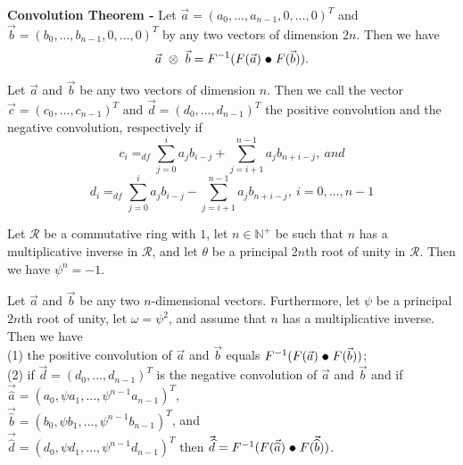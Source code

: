 \documentclass[a4paper]{article}
\begin{document}
\begin{theorem}
\textbf{Convolution Theorem -} Let $\vec{a} = (a_{0}, \ldots, a_{n-1}, 0, \ldots, 0)^{T}$ and $\vec{b} = (b_{0}, \ldots, b_{n-1}, 0, \ldots, 0)^{T}$ by any two vectors of dimension $2n$. Then we have
$$\vec{a}\ \otimes\ \vec{b} = F^{-1}(F(\vec{a})\ \tikz\draw[black,fill=black] (0,0) circle (.5ex);\ F(\vec{b})).$$
\end{theorem}


\begin{definition}
Let $\vec{a}$ and $\vec{b}$ be any two vectors of dimension $n$. Then we call the vector $\vec{c} = (c_{0}, \ldots, c_{n-1})^{T}$ and $\vec{d} = (d_{0}, \ldots, d_{n-1})^{T}$ the positive convolution and the negative convolution, respectively if
$$c_{i} =_{df} \sum_{j=0}^{i}a_{j}b_{i-j} + \sum_{j=i+1}^{n-1}a_{j}b_{n+i-j},\ and$$
$$d_{i} =_{df} \sum_{j=0}^{i}a_{j}b_{i-j} - \sum_{j=i+1}^{n-1}a_{j}b_{n+i-j},\ i=0, \ldots, n - 1$$
\end{definition}


\begin{lemma}
Let $\mathcal{R}$ be a commutative ring with $1$, let $n \in \mathbb{N}^{+}$ be such that $n$ has a multiplicative inverse in $\mathcal{R}$, and let $\theta$ be a principal $2n$th root of unity in $\mathcal{R}$. Then we have $\psi^{n} = -1$.
\end{lemma}


\begin{theorem}
Let $\vec{a}$ and $\vec{b}$ be any two $n$-dimensional vectors. Furthermore, let $\psi$ be a principal $2n$th root of unity, let $\omega = \psi^{2}$, and assume that $n$ has a multiplicative inverse. Then we have \\
(1) the positive convolution of $\vec{a}$ and $\vec{b}$ equals $F^{-1}(F(\vec{a})\ \tikz\draw[black,fill=black] (0,0) circle (.5ex);\ F(\vec{b}))$; \\
(2) if $\vec{d} = (d_{0}, \ldots, d_{n-1})^{T}$ is the negative convolution of $\vec{a}$ and $\vec{b}$ and if $\vec{\widehat{a}} = (a_{0}, \psi a_{1}, \ldots, \psi^{n - 1}a_{n - 1})^{T}$, \\
$\vec{\widehat{b}} = (b_{0}, \psi b_{1}, \ldots, \psi^{n - 1}b_{n - 1})^{T}$, and \\
$\vec{\widehat{d}} = (d_{0}, \psi d_{1}, \ldots, \psi^{n - 1}d_{n - 1})^{T}$ then $\vec{\widehat{d}} = F^{-1}(F(\vec{\widehat{a}})\ \tikz\draw[black,fill=black] (0,0) circle (.5ex);\ F(\vec{\widehat{b}}))$.
\end{theorem}
\end{document}
